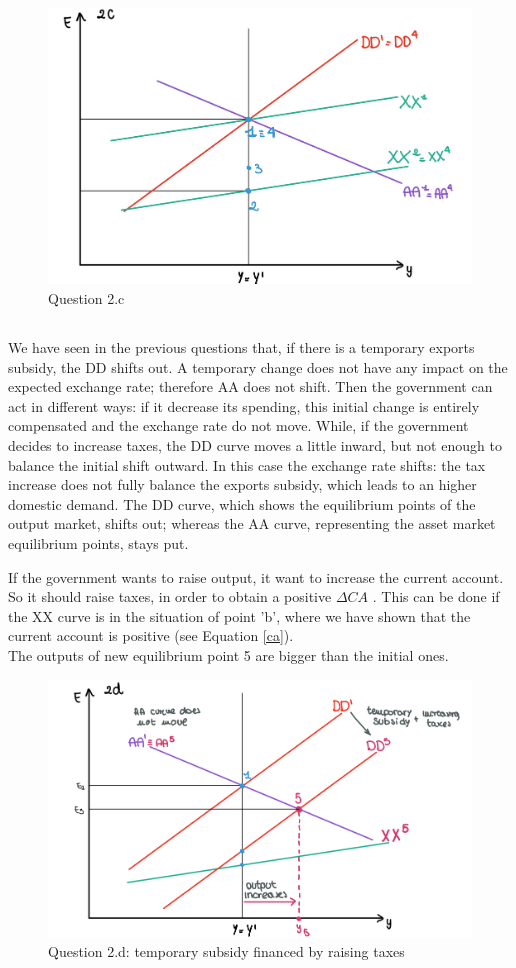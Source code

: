 \documentclass[	11pt, ]{fphw}
\begin{document}
\begin{figure}[h!] 
\centering 
\includegraphics[scale=0.33]{8c.PNG} 
\caption{Question 2.c} 
\label{cc}
\end{figure}

\newpage
\subsection{}
We have seen in the previous questions that, if there is a temporary exports subsidy, the DD shifts out. A temporary change does not have any impact on the expected exchange rate; therefore AA does not shift.
\pat Then the government can act in different ways: if it decrease its spending, this initial change is entirely compensated and the exchange rate do not move. While, if the government decides to increase taxes, the DD curve moves a little inward, but not enough to balance the initial shift outward. In this case the exchange rate shifts: the tax increase does not fully balance the exports subsidy, which leads to an higher domestic demand. The DD curve, which shows the equilibrium points of the output market, shifts out; whereas the AA curve, representing the asset market equilibrium points, stays put.
\par If the government wants to raise output, it want to increase the current account. So it should raise taxes, in order to obtain a positive $\Delta CA$ . This can be done if the XX curve is in the situation of point 'b', where we have shown that the current account is positive (see Equation \ref{ca}). \\
The outputs of new equilibrium point 5 are bigger than the initial ones. 

\begin{figure}[b!] 
\centering 
\includegraphics[scale=0.24]{8d.PNG} 
\caption{Question 2.d: temporary subsidy financed by raising taxes} 
\label{dd}
\end{figure}
\end{document}
